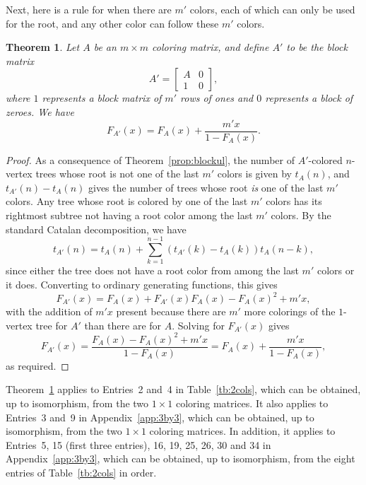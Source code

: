 \documentclass[12pt]{amsart}
\newtheorem{theorem}{Theorem}
\newcommand{\gfll}[1]{F_{#1}(x)}
\newcommand{\gfall}{\gfll{A}}
\begin{document}
Next, here is a rule for when there are $m'$ colors, each of which can only be used for the root, 
and any other color can follow these $m'$ colors.
\begin{theorem}\label{prop:rootonly}
    Let $A$ be an $m\times m$ coloring matrix, and define $A'$ to be the block matrix
    \[
    A'=\left[\begin{array}{c|c}A&0\\\hline1&0\end{array}\right],
    \]
    where $1$ represents a block matrix of $m'$ rows of ones and $0$ represents a block of zeroes. 
    We have
    \[
    \gfll{A'}=\gfall+\frac{m'x}{1-\gfall}.
    \]
\end{theorem}
\begin{proof}
    As a consequence of Theorem~\ref{prop:blockul}, the
    number of $A'$-colored $n$-vertex trees whose root is not one of the last $m'$ colors is given by $t_A(n)$, and $t_{A'}(n)-t_A(n)$ gives the number of trees whose root \emph{is} one of the last $m'$ colors. 
    Any tree whose root is colored by one of the last $m'$ colors has its rightmost subtree not having a root color among the last $m'$ colors. 
    By the standard Catalan decomposition, we have
    \[
    t_{A'}(n)=t_A(n)+\sum_{k=1}^{n-1}(t_{A'}(k)-t_A(k))t_A(n-k),
    \]
    since either the tree does not have a root color from among the last $m'$ colors or it does. 
    Converting to ordinary generating functions,  this gives 
    \[
    \gfll{A'}=\gfall+\gfll{A'}\gfall-\gfall^2+m'x,
    \]
    with the addition of $m'x$ present because there are $m'$ more colorings of the $1$-vertex tree for $A'$ than there are for $A$. 
    Solving for $\gfll{A'}$ gives
    \[
    \gfll{A'}=\frac{\gfall-\gfall^2+m'x}{1-\gfall}=\gfall+\frac{m'x}{1-\gfall},
    \]
    as required.
\end{proof}
Theorem~\ref{prop:rootonly} applies to Entries~2 and~4 in Table~\ref{tb:2cols}, which can be obtained, up to isomorphism, from the two $1\times1$ coloring matrices.
It also applies to Entries~3 and~9 in Appendix~\ref{app:3by3}, which can be obtained, up to isomorphism, from the two $1\times 1$ coloring matrices. 
In addition, it applies to Entries~5, 15 (first three entries), 16, 19, 25, 26, 30 and 34 in Appendix~\ref{app:3by3}, which can be obtained, up to isomorphism, from the eight entries of Table~\ref{tb:2cols} in order.
\end{document}
